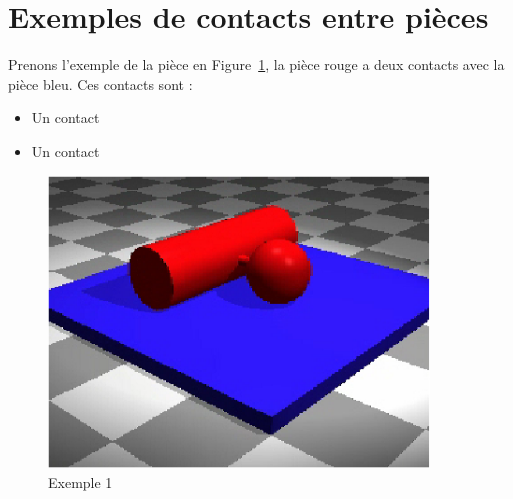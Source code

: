 \documentclass[10pt,fleqn]{article} %
\begin{document}
\section{Exemples de contacts entre pièces}
\begin{exemple}
  Prenons l'exemple de la pièce en Figure~\ref{fig:exemple1}, la pièce rouge a deux contacts avec la pièce bleu. Ces contacts sont :

  \begin{itemize}
    \item Un contact 
    \item Un contact 
  \end{itemize}
\end{exemple}
\begin{figure}[h]
  \centering
  \includegraphics[width=0.9\textwidth,height=.2\textheight,keepaspectratio]{images/lineique_ponctuel}
  \caption{Exemple 1}
  \label{fig:exemple1}
\end{figure}
\end{document}
